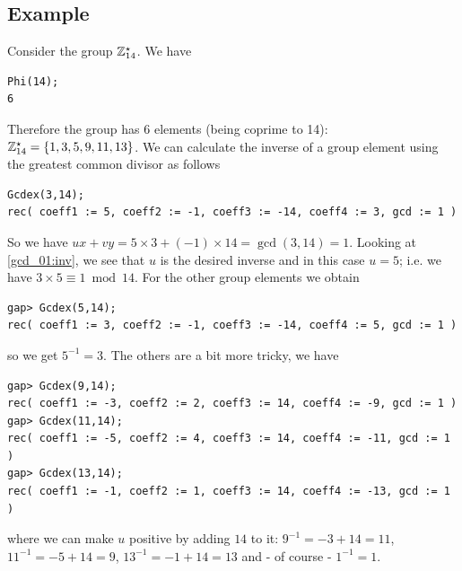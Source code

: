 \subsection{Example}

Consider the group $\mathbb{Z}^\star_{14}$. We have

\begin{verbatim}
Phi(14);
6
\end{verbatim}
%
Therefore the group has $6$ elements (being coprime to 14): $\mathbb{Z}^\star_{14} = \{1, 3, 5, 9, 11, 13\}$. We can calculate the inverse of a group element using the greatest common divisor as follows

\begin{verbatim}
Gcdex(3,14);
rec( coeff1 := 5, coeff2 := -1, coeff3 := -14, coeff4 := 3, gcd := 1 )
\end{verbatim}
%
So we have $ux + vy = 5 \times 3 + (-1) \times 14 = \gcd(3,14) = 1$. Looking at \eqref{gcd_01:inv}, we see that $u$ is the desired inverse and in this case $u=5$; i.e. we have $3 \times 5 \equiv 1 \bmod 14$. For the other group elements we obtain

\begin{verbatim}
gap> Gcdex(5,14);
rec( coeff1 := 3, coeff2 := -1, coeff3 := -14, coeff4 := 5, gcd := 1 )
\end{verbatim}
%
so we get $5^{-1} = 3$. The others are a bit more tricky, we have

\begin{verbatim}
gap> Gcdex(9,14);
rec( coeff1 := -3, coeff2 := 2, coeff3 := 14, coeff4 := -9, gcd := 1 )
gap> Gcdex(11,14);
rec( coeff1 := -5, coeff2 := 4, coeff3 := 14, coeff4 := -11, gcd := 1 )
gap> Gcdex(13,14);
rec( coeff1 := -1, coeff2 := 1, coeff3 := 14, coeff4 := -13, gcd := 1 )
\end{verbatim}
%
where we can make $u$ positive by adding $14$ to it: $9^{-1} = -3 + 14 = 11$, $11^{-1} = -5 + 14 = 9$, $13^{-1} = -1 + 14 = 13$ and - of course - $1^{-1} = 1$.
